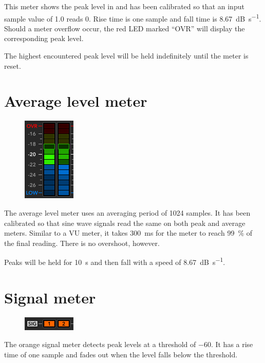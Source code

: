 This meter shows the peak level in \si{\dBFS} and has been calibrated
so that an input sample value of 1.0 reads \SI{0}{\dBFS}.  Rise time
is one sample and fall time is \SI{8.67}{\dB\per\second}.  Should a
meter overflow occur, the red LED marked ``OVR'' will display the
corresponding peak level.

The highest encountered peak level will be held indefinitely until the
meter is reset.

\newpage %

\section{Average level meter}

\begin{figure}
\includegraphics[scale=\screenshotscale,clip]{include/images/level_meter_average.png}
\end{figure}

The average level meter uses an averaging period of \num{1024}
samples.  It has been calibrated so that sine wave signals read the
same on both peak and average meters.  Similar to a VU meter, it takes
\SI{300}{\milli\second} for the meter to reach \SI{99}{\percent} of
the final reading.  There is no overshoot, however.

Peaks will be held for \SI{10}{\second} and then fall with a speed of
\SI{8.67}{\dB\per\second}.

\section{Signal meter}

\begin{figure}
\includegraphics[scale=\screenshotscale,clip]{include/images/level_meter_signal.png}
\end{figure}

The orange signal meter detects peak levels at a threshold of
\SI{-60}{\dBFS}.  It has a rise time of one sample and fades out when
the level falls below the threshold.

